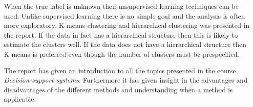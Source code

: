 When the true label is unknown then unsupervised learning techniques can be used. Unlike supervised learning there is no simple goal and the analysis is often more exploratory. K-means clustering and hierarchical clustering was presented in the report. If the data in fact has a hierarchical structure then this is likely to estimate the clusters well. If the data does not have a hierarchical structure then K-means is preferred even though the number of clusters must be prespecified. 

The report has given an introduction to all the topics presented in the course \emph{Decision support systems}. Furthermore it has given insight in the advantages and disadvantages of the different methods and understanding when a method is applicable.




